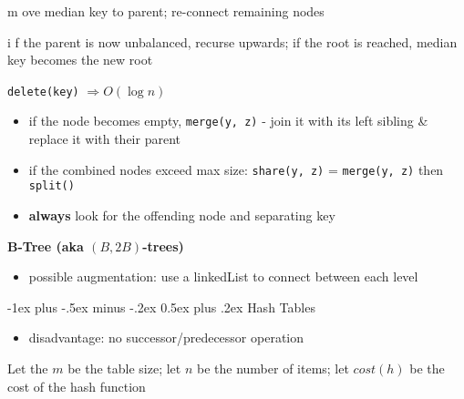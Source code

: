 \documentclass[10pt, landscape]{article}
\makeatletter
\renewcommand{\section}{\@startsection{section}{1}{0mm}%
                                {-1ex plus -.5ex minus -.2ex}%
                                {0.5ex plus .2ex}%
                                {\normalfont\large\bfseries}}
\renewcommand{\subsection}{\@startsection{subsection}{2}{0mm}%
                                {-1explus -.5ex minus -.2ex}%
                                {0.5ex plus .2ex}%
                                {\normalfont\normalsize\bfseries}}
\let\Then\Rightarrow
\newcommand{\code}[1]{\textcolor{myblue}{\texttt{#1}}}
\let\OldItem\item
\newcommand{\SubItemStart}[1]{%
    \let\item\SubItemEnd
    \begin{SubItemList}[resume]%
        \OldItem #1%
}
\newcommand{\SubItemMiddle}[1]{%
    \OldItem #1%
}
\newcommand{\SubItemEnd}[1]{%
    \end{SubItemList}%
    \let\item\OldItem
    \item #1%
}
\newcommand*{\SubItem}[1]{%
    \let\SubItem\SubItemMiddle%
    \SubItemStart{#1}%
}%
\makeatother
\begin{document}
\begin{multicols}{4}
\begin{itemize}
    \SubItem move median key to parent; re-connect remaining nodes
    \SubItem if the parent is now unbalanced, recurse upwards; if the root is reached, median key becomes the new root
    \item \code{delete(key)} $\Then O(\log n)$
    \begin{itemize}
        \item if the node becomes empty, \code{merge(y, z)} - join it with its left sibling \& replace it with their parent
        \item if the combined nodes exceed max size: \code{share(y, z)} = \code{merge(y, z)} then \code{split()}
        \item \textbf{always} look for the offending node and separating key
    \end{itemize}
\end{itemize}

\textbf{B-Tree (aka $(B, 2B)$-trees)}
\begin{itemize}
    \item possible augmentation: use a linkedList to connect between each level
\end{itemize}

\section{Hash Tables}
\begin{itemize}
    \item disadvantage: no successor/predecessor operation
\end{itemize}

Let the $m$ be the table size; 
let $n$ be the number of items;
let $cost(h)$ be the cost of the hash function


\end{multicols}
\end{document}
